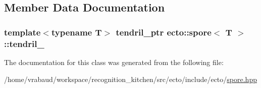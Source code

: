 \subsection{Member Data Documentation}
\hypertarget{structecto_1_1spore_a17e2ffe6861f828cad58904d20f117d4}{
\subsubsection[{tendril\-\_\-}]{\setlength{\rightskip}{0pt plus 5cm}template$<$typename T$>$ {\bf tendril\-\_\-ptr} {\bf ecto\-::spore}$<$ T $>$\-::tendril\-\_\-\hspace{0.3cm}{\ttfamily [private]}}}\label{structecto_1_1spore_a17e2ffe6861f828cad58904d20f117d4}


The documentation for this class was generated from the following file\-:\begin{DoxyCompactItemize}
\item 
/home/vrabaud/workspace/recognition\-\_\-kitchen/src/ecto/include/ecto/\hyperlink{spore_8hpp}{spore.\-hpp}\end{DoxyCompactItemize}
